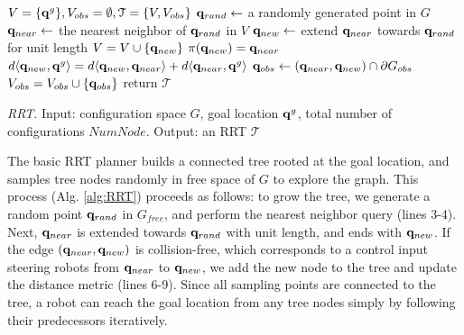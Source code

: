     \begin{algorithm}[h]
    	
    	\begin{algorithmic}[1]
    		\STATE $ V = \{{\bf q}^g\},V_{obs}=\emptyset,\mathcal{T} = \{V,V_{obs}\}$
    		\STATE ${\bf q}_{rand} \leftarrow$ a randomly generated point in $G$
    		\STATE ${\bf q}_{near} \leftarrow$ the nearest neighbor of ${\bf q}_{rand}$ in $V$
    		\STATE ${\bf q}_{new} \leftarrow$ extend ${\bf q}_{near}$ towards ${\bf q}_{rand}$ for unit length %
    		\STATE $V = V \cup \{{\bf q}_{new}\}$
    		\STATE $\pi({\bf q}_{new})={\bf q}_{near}$
    		\STATE $d\langle {\bf q}_{new}, {\bf q}^g\rangle = d\langle {\bf q}_{new}, {\bf q}_{near}\rangle + d\langle {\bf q}_{near}, {\bf q}^g\rangle   $
    		\ELSE
    		\STATE ${\bf q}_{obs} \leftarrow ({\bf q}_{near},{\bf q}_{new}) \cap \partial G_{obs}$
    		\STATE $V_{obs} = V_{obs} \cup \{{\bf q}_{obs}\}$
    		\ENDIF
    		\ENDWHILE
    		\STATE return $\mathcal{T}$
    	\end{algorithmic}
    	\caption{\textit {RRT}. Input: configuration space $G$, goal location ${\bf q}^g$, total number of configurations $NumNode$. Output: an RRT $\mathcal{T}$}
    	\label{alg:RRT}
    	
    \end{algorithm}
The basic RRT planner builds a connected tree rooted at the goal location, and samples tree nodes randomly in free space of $G$ to explore the graph. This process (Alg. \ref{alg:RRT}) proceeds as follows: to grow the tree, we generate a random point ${\bf q}_{rand}$ in $G_{free}$, and perform the nearest neighbor query (lines 3-4). Next, ${\bf q}_{near}$ is extended towards ${\bf q}_{rand}$ with unit length, and ends with ${\bf q}_{new}$. If the edge $({\bf q}_{near},{\bf q}_{new})$ is collision-free, which corresponds to a control input steering robots from ${\bf q}_{near}$ to ${\bf q}_{new}$, we add the new node to the tree and update the distance metric (lines 6-9).  Since all sampling points are connected to the tree, a robot can reach the goal location from any tree nodes simply by following their predecessors iteratively. 






